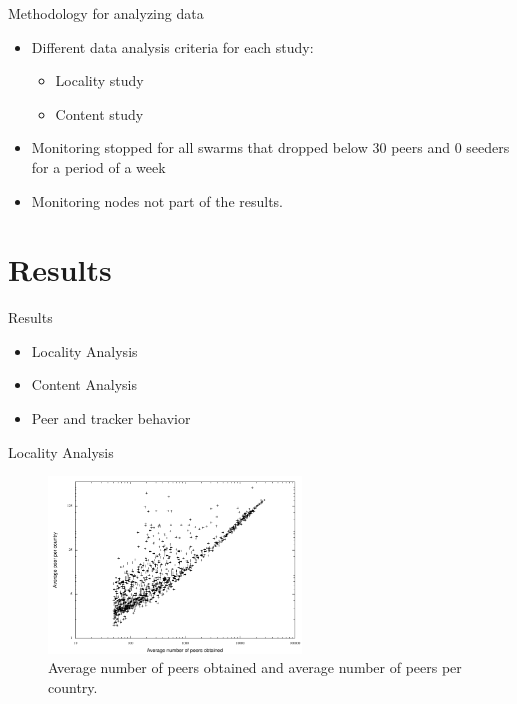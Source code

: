 \documentclass{beamer}
\begin{document}
\begin{frame}{Methodology for analyzing data}

\begin{itemize}
\addtolength{\itemsep}{1\baselineskip}
\item Different data analysis criteria for each study:
\begin{itemize}
\item
   Locality study
\item
   Content study
\end{itemize}

\item
   Monitoring stopped for all swarms that dropped below 30 peers and 0 seeders for a period of a week

\item
  Monitoring nodes not part of the results.
\end{itemize}
\end{frame}



\section{Results}

\begin{frame}{Results}

\begin{itemize}
\addtolength{\itemsep}{1\baselineskip}
\item
    Locality Analysis
\item
     Content Analysis
\item
     Peer and tracker behavior
\end{itemize}
\end{frame}


\begin{frame}{Locality Analysis}

\begin{figure}[h]
\center
\includegraphics[height=1.85in]{Figures/countryPeers_AVGPerPeers}
\caption{Average number of peers obtained and average number of peers per country.}
\label{fig:torrent_avg_country} 
\end{figure}

\end{frame}
\end{document}
